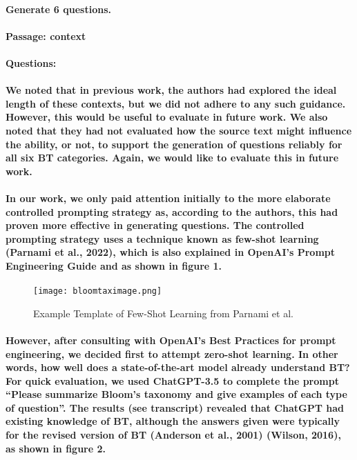 \documentclass{article}
\begin{document}
\paragraph{Generate 6 questions.}
\paragraph{Passage: {context}}
\paragraph{Questions:}

\paragraph{We noted that in previous work, the authors had explored the ideal length of these contexts, but we did not adhere to any such guidance. However, this would be useful to evaluate in future work. We also noted that they had not evaluated how the source text might influence the ability, or not, to support the generation of questions reliably for all six BT categories. Again, we would like to evaluate this in future work.}

\paragraph{In our work, we only paid attention initially to the more elaborate controlled prompting strategy as, according to the authors, this had proven more effective in generating questions. The controlled prompting strategy uses a technique known as few-shot learning (Parnami et al., 2022), which is also explained in OpenAI’s Prompt Engineering Guide and as shown in figure 1.}

\begin{figure}[h!tbp]
    \centering
    \texttt{[image: bloomtaximage.png]}
    \caption{Example Template of Few-Shot Learning from Parnami et al.}
    \label{fig:1}
\end{figure}

\paragraph{However, after consulting with OpenAI’s Best Practices for prompt engineering, we decided first to attempt zero-shot learning. In other words, how well does a state-of-the-art model already understand BT? For quick evaluation, we used ChatGPT-3.5 to complete the prompt “Please summarize Bloom's taxonomy and give examples of each type of question”. The results (see transcript) revealed that ChatGPT had existing knowledge of BT, although the answers given were typically for the revised version of BT (Anderson et al., 2001) (Wilson, 2016), as shown in figure 2.}
\end{document}
